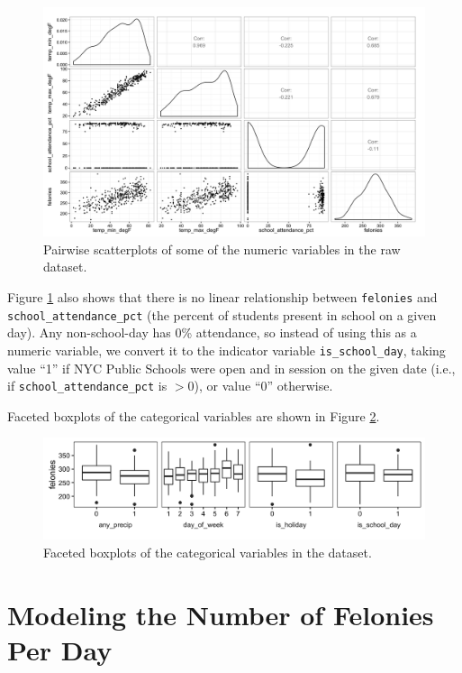 \documentclass[11pt,notitlepage]{article}
\begin{document}
\begin{figure}[!h]
	\centering
	\captionsetup{width=0.9\textwidth}
	\includegraphics[width=6in]{figures/pairsNumericExclAcc.png}
	\caption{Pairwise scatterplots of some of the numeric variables in the raw dataset.}
	\label{fig:pairsNumericExclAcc}
\end{figure}


Figure \ref{fig:pairsNumericExclAcc} also shows that there is no linear relationship between \texttt{felonies} and \texttt{school_attendance_pct} (the percent of students present in school on a given day). Any non-school-day has 0\% attendance, so instead of using this as a numeric variable, we convert it to the indicator variable \texttt{is_school_day}, taking value ``1'' if NYC Public Schools were open and in session on the given date (i.e., if \texttt{school_attendance_pct} is $>0$), or value ``0'' otherwise.

Faceted boxplots of the categorical variables are shown in Figure \ref{fig:facetCategorical}.

\begin{figure}[!h]
	\centering
	\captionsetup{width=0.9\textwidth}
	\includegraphics[width=6in]{figures/facetCategorical.png}
	\caption{Faceted boxplots of the categorical variables in the dataset.}
	\label{fig:facetCategorical}
\end{figure}

\section{Modeling the Number of Felonies Per Day}
\end{document}
